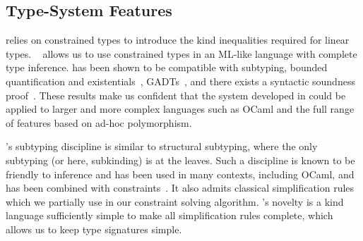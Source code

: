 \subsection{Type-System Features}
%
\lang relies on constrained types
to introduce the kind inequalities required for linear types.
\hmx~\citep{DBLP:journals/tapos/OderskySW99} 
allows us to use constrained types in an ML-like language with complete
type inference.
\hmx has been shown to be compatible with subtyping,
bounded quantification and existentials~\citep{DBLP:conf/icfp/Simonet03},
GADTs~\citep{DBLP:journals/toplas/SimonetP07},
and there exists a syntactic soundness proof~\citep{DBLP:journals/entcs/SkalkaP02}.
These results make us confident that the system developed in \lang
could be applied to larger and more complex languages such as OCaml
and the full range of features based on ad-hoc polymorphism.

\lang's  subtyping discipline is similar
to structural subtyping, where the only subtyping (or here, subkinding)
is at the leaves.
Such a discipline is known to be friendly to inference and has been used in many
contexts, including OCaml, and has been combined
with constraints~\citep{DBLP:journals/tapos/OderskySW99,DBLP:conf/sas/TrifonovS96}.
It also admits classical simplification rules
\citep{DBLP:conf/aplas/Simonet03,DBLP:conf/popl/PottierS02} which we partially use
in our constraint solving algorithm.
\affe's novelty is a kind language
sufficiently simple to make
all simplification rules complete, which allows us to keep type signatures simple.



